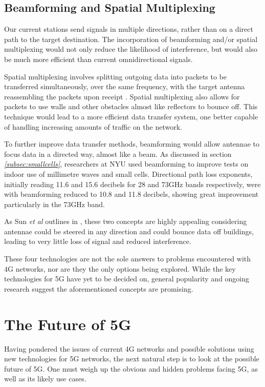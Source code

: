 \documentclass[journal]{IEEEtran}
\begin{document}
\subsection{Beamforming and Spatial Multiplexing}\label{subsec:beamspac}
Our current stations send signals in multiple directions, rather than on a direct path to the target destination. The incorporation of beamforming and/or spatial multiplexing would not only reduce the likelihood of interference, but would also be much more efficient than current omnidirectional signals.

Spatial multiplexing involves splitting outgoing data into packets to be transferred simultaneously, over the same frequency, with the target antenna reassembling the packets upon receipt \cite{beam_sm}. Spatial multiplexing also allows for packets to use walls and other obstacles almost like reflectors to bounce off. This technique would lead to a more efficient data transfer system, one better capable of handling increasing amounts of traffic on the network.

To further improve data transfer methods, beamforming would allow antennae to focus data in a directed way, almost like a beam. As discussed in section \textit{\ref{subsec:smallcells}}, researchers at NYU used beamforming to improve tests on indoor use of millimetre waves and small cells. Directional path loss exponents, initially reading 11.6 and 15.6 decibels for 28 and 73GHz bands respectively, were with beamforming reduced to 10.8 and 11.8 decibels, showing great improvement particularly in the 73GHz band.

As Sun \textit{et al} outlines in \cite{beam_sm}, these two concepts are highly appealing considering antennae could be steered in any direction and could bounce data off buildings, leading to very little loss of signal and reduced interference.
\bigskip

These four technologies are not the sole answers to problems encountered with 4G networks, nor are they the only options being explored. While the key technologies for 5G have yet to be decided on, general popularity and ongoing research suggest the aforementioned concepts are promising.

\section{The Future of 5G}
Having pondered the issues of current 4G networks and possible solutions using new technologies for 5G networks, the next natural step is to look at the possible future of 5G. One must weigh up the obvious and hidden problems facing 5G, as well as its likely use cases.
\end{document}
